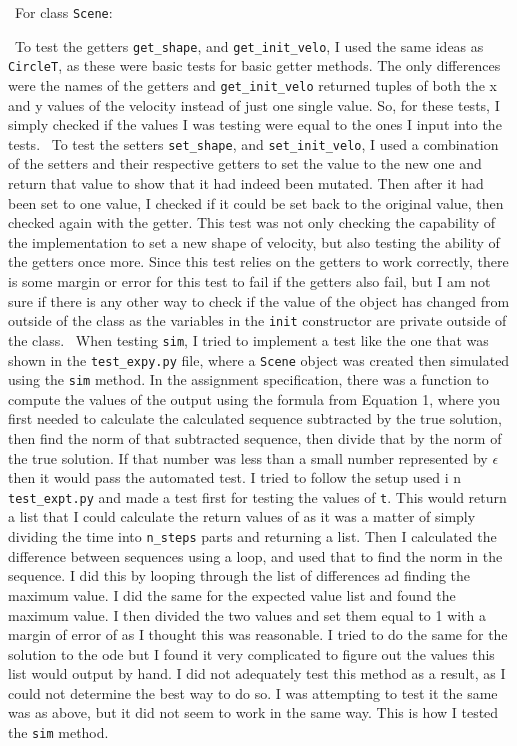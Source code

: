 \documentclass[12pt]{article}
\begin{document}
~\newline\noindent For class \verb|Scene|:

~\newline\noindent To test the getters \verb|get_shape|, and \verb|get_init_velo|, I used the 
same ideas as \verb|CircleT|, as these were basic tests for basic getter methods. The only 
differences were the names of the getters and \verb|get_init_velo| returned tuples of both the x
and y values of the velocity instead of just one single value. So, for these tests, I simply 
checked if the values I was testing were equal to the ones I input into the tests. 
~\newline\noindent To test the setters \verb|set_shape|, and \verb|set_init_velo|, I used a 
combination of the setters and their respective getters to set the value to the new one and 
return that value to show that it had indeed been mutated. Then after it had been set to one 
value, I checked if it could be set back to the original value, then checked again with the 
getter. This test was not only checking the capability of the implementation to set a new shape 
of velocity, but also testing the ability of the getters once more. Since this test relies on the
getters to work correctly, there is some margin or error for this test to fail if the getters 
also fail, but I am not sure if there is any other way to check if the value of the object has 
changed from outside of the class as the variables in the \verb|init| constructor are private 
outside of the class. 
~\newline\noindent When testing \verb|sim|, I tried to implement a test like the one that was 
shown in the \verb|test_expy.py| file, where a \verb|Scene| object was created then simulated 
using the \verb|sim| method. In the assignment specification, there was a function to compute the 
values of the output using the formula from Equation 1, where you first needed to calculate the 
calculated sequence subtracted by the true solution, then find the norm of that subtracted 
sequence, then divide that by the norm of the true solution. If that number was less than a small 
number represented by $\epsilon$ then it would pass the automated test. I tried to follow the 
setup used i n \verb|test_expt.py| and made a test first for testing the values of \verb|t|. This 
would return a list that I could calculate the return values of as it was a matter of simply 
dividing the time into \verb|n_steps| parts and returning a list. Then I calculated the 
difference between sequences using a loop, and used that to find the norm in the sequence. I did 
this by looping through the list of differences ad finding the maximum value. I did the same for 
the expected value list and found the maximum value. I then divided the two values and set them 
equal to 1 with a margin of error of  as I thought this was reasonable. I tried to do
the same for the solution to the ode but I found it very complicated to figure out the values 
this list would output by hand. I did not adequately test this method as a result, as I could not 
determine the best way to do so. I was attempting to test it the same was as above, but it did 
not seem to work in the same way. This is how I tested the \verb|sim| method. 
\end{document}

